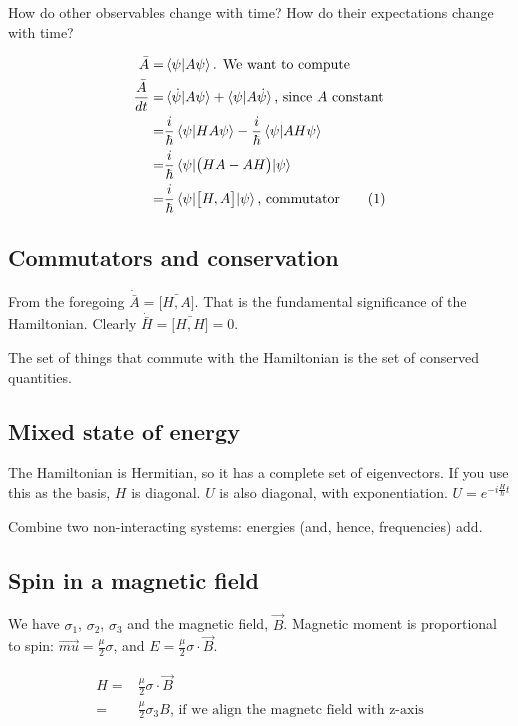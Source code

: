 \documentclass[]{article}
\newcommand\numberthis{\addtocounter{equation}{1}\tag{\theequation}}
\begin{document}
How do other observables change with time? How do their expectations change with time?

\begin{align*}
	\bar{A} =&\braket{\psi\vert A \psi}\text{. We want to compute}\\
	\frac{\bar{A}}{dt} =&	\braket{\dot{\psi}\vert A \psi} + \braket{\psi\vert A \dot{\psi}} \text{, since $A$ constant}\\
	=& \frac{i}{\hbar}\braket{\psi\vert H A \psi} - \frac{i}{\hbar}\braket{\psi\vert A H \psi}\\
	=& \frac{i}{\hbar} \braket{\psi \vert \big(HA-AH\big)\vert \psi}\\
	=& \frac{i}{\hbar} \braket{\psi \vert \big[H,A\big]\vert \psi} \text {, commutator} \numberthis \label{eq:evolve:state}
\end{align*}

\subsection{Commutators and conservation}

From the foregoing $\dot{\bar{A}} = \bar{\big[H,A\big]}$. That is the fundamental significance of the Hamiltonian. Clearly $\dot{\bar{H}} = \bar{\big[H,H\big]} = 0$.

The set of things that commute with the Hamiltonian is the set of conserved quantities.

\subsection{Mixed state of energy}

The Hamiltonian is Hermitian, so it has a complete set of eigenvectors. If you use this as the basis, $H$ is diagonal. $U$ is also diagonal, with exponentiation. $U = e^{-i\frac{H}{\hbar}t}$

Combine two non-interacting systems: energies (and, hence, frequencies) add.

\subsection{Spin in a magnetic field}

We have $\sigma_1$, $\sigma_2$, $\sigma_3$ and the magnetic field, $\vec{B}$. Magnetic moment is proportional to spin: $\vec{mu} = \frac{\mu}{2}\sigma$, and $E=\frac{\mu}{2}\sigma \cdot \vec{B}.$

\begin{align*}
	H =& \frac{\mu}{2}\sigma \cdot \vec{B}\\
	=& \frac{\mu}{2}\sigma_3 B \text{, if we align the magnetc field with z-axis}
\end{align*}
\end{document}
